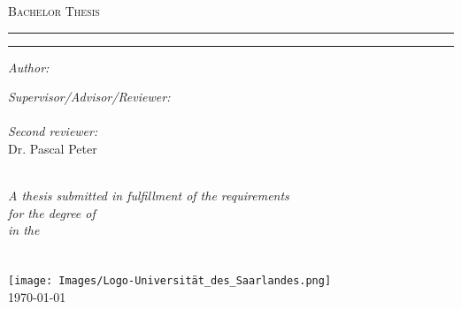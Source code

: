 \documentclass[
12pt, %
oneside, %
english, %
onehalfspacing, %
headsepline, %
chapterinoneline, %
]{MastersDoctoralThesis} %
\author{Daniel Gusenburger} %
\begin{document}
\frontmatter %

\pagestyle{plain} %


\begin{titlepage}
    \begin{center}
        {\scshape\LARGE \univname\par}\vspace{1cm} %
        \textsc{\Large Bachelor Thesis}\\[0.5cm] %
        \hrule
        \vspace{0.5cm}
        {\huge \bfseries \ttitle\par}
        \vspace{0.5cm} %
        \hrule
        \vspace{1.5cm}

        \begin{minipage}[t]{0.4\textwidth}
            \begin{flushleft} \large
                \emph{Author:}\\
                \authorname %
            \end{flushleft}
        \end{minipage}
        \begin{minipage}[t]{0.5\textwidth}
            \begin{flushright} \large
                \emph{Supervisor/Advisor/Reviewer:} \\
                \supname \\[0.3cm]
                \emph{Second reviewer:}\\
                Dr. Pascal Peter
            \end{flushright}
        \end{minipage}\\[1cm]
        \large \textit{A thesis submitted in fulfillment of the requirements\\ for the degree of \degreename}\\[0.3cm] %
        \textit{in the}\\[0.3cm]
        \groupname\\\deptname\\[1cm] %
        \texttt{[image: Images/Logo-Universität\_des\_Saarlandes.png]} \\[1cm]
        \vfill
        {\large \today}
    \end{center}
\end{titlepage}
\end{document}
